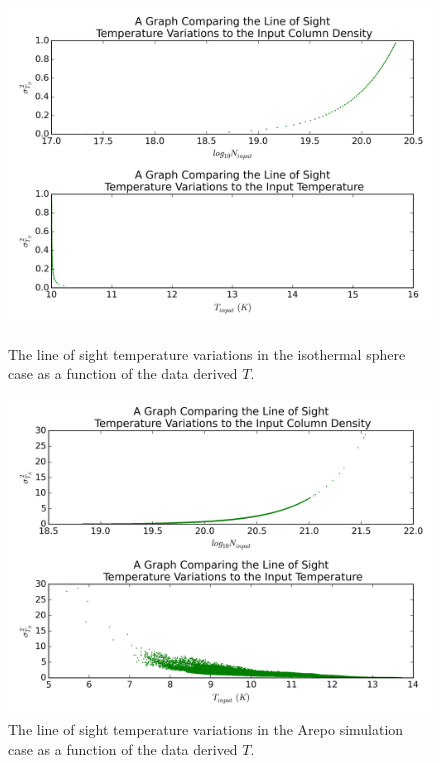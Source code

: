 \documentclass{report}
\begin{document}
\begin{figure}[H]
  \includegraphics[width=\linewidth]{../img/sim/sigma_T_inp.png}
  \caption{The line of sight temperature variations in the isothermal sphere case as a function of the data derived $T$.}\label{fig:iso_los}
\endminipage\hfill
{}
  \includegraphics[width=\linewidth]{../img/sph/sigma_T_inp.png}
  \caption{The line of sight temperature variations in the Arepo simulation case as a function of the data derived $T$.}\label{fig:sph_sph}
\endminipage
\end{figure}
\end{document}
